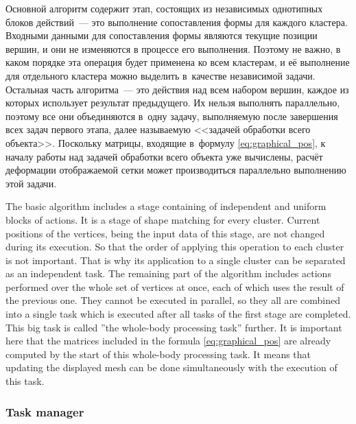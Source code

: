 \documentclass[a4paper, 12pt, titlepage]{extarticle}
\begin{document}
\begin{original}
        Основной алгоритм содержит этап, состоящих из независимых однотипных блоков
        действий~--- это выполнение сопоставления формы для каждого кластера. Входными данными для
        сопоставления формы являются текущие позиции вершин, и они не изменяются в процессе
        его выполнения. Поэтому не важно, в каком порядке эта операция будет применена ко всем
        кластерам, и её выполнение для отдельного кластера можно выделить в~качестве независимой задачи. Остальная
        часть алгоритма~--- это действия над всем набором вершин, каждое из которых использует
        результат предыдущего. Их нельзя выполнять параллельно, поэтому все они объединяются в~одну
        задачу, выполняемую после завершения всех задач первого этапа, далее называемую <<задачей
        обработки всего объекта>>. Поскольку матрицы, входящие
        в~формулу \eqref{eq:graphical_pos}, к началу работы над задачей обработки всего объекта уже вычислены,
        расчёт деформации отображаемой сетки может производиться параллельно выполнению этой задачи.
\end{original}

        The basic algorithm includes a stage containing of independent and uniform blocks of
        actions. It is a stage of shape matching for every cluster. Current positions of the
        vertices, being the input data of this stage, are not changed during its execution. So that
        the order of applying this operation to each cluster is not important. That is why its
        application to a single cluster can be separated as an independent task. The remaining part
        of the algorithm includes actions performed over the whole set of vertices at once, each of
        which uses the result of the previous one. They cannot be executed in parallel, so they all
        are combined into a single task which is executed after all tasks of the first stage are
        completed. This big task is called ''the whole-body processing task'' further. It is
        important here that the matrices included in the formula \eqref{eq:graphical_pos} are
        already computed by the start of this whole-body processing task. It means that updating the
        displayed mesh can be done simultaneously with the execution of this task.

      \subsubsection{Task manager}\label{sssec:task_manager}
\end{document}

